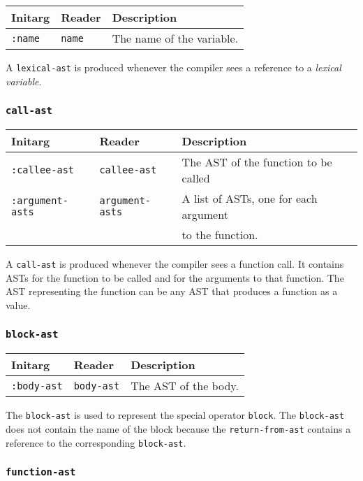 \begin{tabular}{|l|l|l|}
\hline
Initarg & Reader & Description\\
\hline\hline
\texttt{:name} & \texttt{name} & The name of the variable.\\  
\hline
\end{tabular}

A \texttt{lexical-ast} is produced whenever the compiler sees a
reference to a \emph{lexical variable}. 

\subsubsection{\texttt{call-ast}}
\label{call-ast}

\begin{tabular}{|l|l|l|}
\hline
Initarg & Reader & Description\\
\hline\hline
\texttt{:callee-ast} & \texttt{callee-ast} & The AST of the function
to be called\\  
\hline
\texttt{:argument-asts} & \texttt{argument-asts} & A list of ASTs, one
for each argument\\
& & to the function.\\
\hline
\end{tabular}

A \texttt{call-ast} is produced whenever the compiler sees a function
call.  It contains ASTs for the function to be called and for the
arguments to that function.  The AST representing the function can be
any AST that produces a function as a value.

\subsubsection{\texttt{block-ast}}
\label{block-ast}

\begin{tabular}{|l|l|l|}
\hline
Initarg & Reader & Description\\
\hline\hline
\texttt{:body-ast} & \texttt{body-ast} & The AST of the body.\\
\hline
\end{tabular}

The \texttt{block-ast} is used to represent the \commonlisp{} special operator
\texttt{block}.  The \texttt{block-ast} does not contain the name of
the block because the \texttt{return-from-ast} contains a reference to
the corresponding \texttt{block-ast}.

\subsubsection{\texttt{function-ast}}
\label{function-ast}

